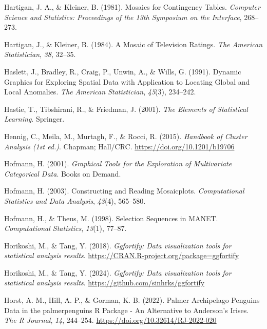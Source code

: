\documentclass[
  letterpaper,
]{krantz}
\newlength{\cslhangindent}
\newenvironment{CSLReferences}[2] %
 {\begin{list}{}{%
  \setlength{\itemindent}{0pt}
  \setlength{\leftmargin}{0pt}
  \setlength{\parsep}{0pt}
  \ifodd #1
   \setlength{\leftmargin}{\cslhangindent}
   \setlength{\itemindent}{-1\cslhangindent}
  \fi
  \setlength{\itemsep}{#2\baselineskip}}}
 {\end{list}}
\begin{document}
\begin{CSLReferences}{1}{0}
Hartigan, J. A., \& Kleiner, B. (1981). Mosaics for {C}ontingency
{T}ables. \emph{Computer Science and Statistics: Proceedings of the 13th
Symposium on the Interface}, 268--273.

Hartigan, J., \& Kleiner, B. (1984). A {M}osaic of {T}elevision
{R}atings. \emph{The American Statistician}, \emph{38}, 32--35.

Haslett, J., Bradley, R., Craig, P., Unwin, A., \& Wills, G. (1991).
{D}ynamic {G}raphics for {E}xploring {S}patial {D}ata with {A}pplication
to {L}ocating {G}lobal and {L}ocal {A}nomalies. \emph{The American
Statistician}, \emph{45}(3), 234--242.

Hastie, T., Tibshirani, R., \& Friedman, J. (2001). \emph{The {E}lements
of {S}tatistical {L}earning}. Springer.

Hennig, C., Meila, M., Murtagh, F., \& Rocci, R. (2015). \emph{Handbook
of {C}luster {A}nalysis (1st ed.)}. Chapman; Hall/CRC.
\url{https://doi.org/10.1201/b19706}

Hofmann, H. (2001). \emph{Graphical {T}ools for the {E}xploration of
{M}ultivariate {C}ategorical {D}ata}. Books on Demand.

Hofmann, H. (2003). Constructing and {R}eading {M}osaicplots.
\emph{Computational Statistics and Data Analysis}, \emph{43}(4),
565--580.

Hofmann, H., \& Theus, M. (1998). Selection {S}equences in {MANET}.
\emph{Computational Statistics}, \emph{13}(1), 77--87.

Horikoshi, M., \& Tang, Y. (2018). \emph{Ggfortify: Data visualization
tools for statistical analysis results}.
\url{https://CRAN.R-project.org/package=ggfortify}

Horikoshi, M., \& Tang, Y. (2024). \emph{Ggfortify: Data visualization
tools for statistical analysis results}.
\url{https://github.com/sinhrks/ggfortify}

Horst, A. M., Hill, A. P., \& Gorman, K. B. (2022). Palmer {A}rchipelago
{P}enguins {D}ata in the palmerpenguins {R} {P}ackage - {A}n
{A}lternative to {A}nderson's {I}rises. \emph{The R Journal}, \emph{14},
244--254. \url{https://doi.org/10.32614/RJ-2022-020}


\end{CSLReferences}
\end{document}
